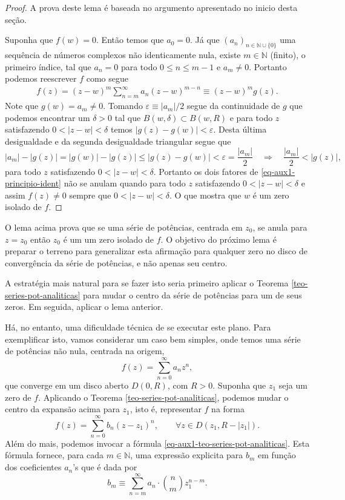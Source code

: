 \begin{proof}
A prova deste lema é baseada no argumento apresentado no inicio desta seção. 

Suponha que $f(w)=0$. Então temos que $a_0=0$. 
Já que $(a_n)_{n\in\mathbb{N}\cup\{0\}}$ uma sequência de números complexos
não identicamente nula, existe $m\in\mathbb{N}$ (finito),
o primeiro índice, tal que $a_{n}=0$ para todo $0\leqslant n\leqslant m-1$
e $a_{m}\neq 0$. Portanto podemos reescrever $f$ como segue
\begin{align}\label{eq-aux1-principio-ident}
f(z) = (z-w)^{m}\sum_{n=m}^{\infty}a_{n}(z-w)^{m-n}
\equiv (z-w)^{m}g(z).
\end{align}
Note que $g(w)=a_m\neq 0$. Tomando $\varepsilon\equiv |a_m|/2$ segue
da continuidade de $g$ que podemos encontrar um 
$\delta>0$ tal que $B(w,\delta)\subset B(w,R)$ e 
para todo $z$ satisfazendo $0<|z-w|<\delta$ temos $|g(z)-g(w)|<\varepsilon$.
Desta última desigualdade e da segunda desigualdade triangular segue que 
\[
|a_m|-|g(z)|=|g(w)|-|g(z)| \leqslant |g(z)-g(w)|<\varepsilon = \frac{|a_m|}{2}
\quad \Longrightarrow \quad\frac{|a_m|}{2}<|g(z)|,
\]
para todo $z$ satisfazendo $0<|z-w|<\delta$. 
Portanto os dois fatores de \eqref{eq-aux1-principio-ident} não se anulam 
quando para todo $z$ satisfazendo $0<|z-w|<\delta$ e assim $f(z)\neq 0$
sempre que $0<|z-w|<\delta$. O que mostra que $w$ é um zero isolado de $f$.
\end{proof}


\bigskip 

O lema acima prova que se uma série de potências, centrada em $z_0$, 
se anula para $z=z_0$ então $z_0$ é um um zero isolado de $f$. 
O objetivo do próximo lema é preparar o terreno para generalizar
esta afirmação para qualquer zero no disco de convergência da série 
de potências, e não apenas seu centro. 

A estratégia mais natural para se fazer isto seria primeiro aplicar o 
Teorema \ref{teo-series-pot-analiticas} para mudar o centro 
da série de potências para um de seus zeros. Em
seguida, aplicar o lema anterior. 

Há, no entanto, uma dificuldade técnica
de se executar este plano. 
Para exemplificar isto, vamos considerar um caso bem simples, onde 
temos uma série de potências não nula, centrada na origem, 
\[
f(z) = \sum_{n=0}^{\infty} a_nz^n,
\]
que converge em um disco aberto $D(0,R)$, com $R>0$.
Suponha que $z_1$ seja um zero de $f$. 
Aplicando o Teorema \ref{teo-series-pot-analiticas}, podemos mudar o centro 
da expansão acima para $z_1$, isto é, representar $f$ na forma
\[
f(z) = \sum_{n=0}^{\infty} b_n(z-z_1)^n, \qquad \forall z\in D(z_1,R-|z_1|).
\]
Além do mais, podemos invocar a fórmula \eqref{eq-aux1-teo-series-pot-analiticas}.
Esta fórmula fornece, para cada $m\in\mathbb{N}$, uma expressão explicita para $b_m$ em função dos
coeficientes $a_n$'s que é dada por 
\[
b_m \equiv \sum_{n=m}^{\infty}  a_n\cdot \binom{n}{m}z_1^{n-m}.
\]

